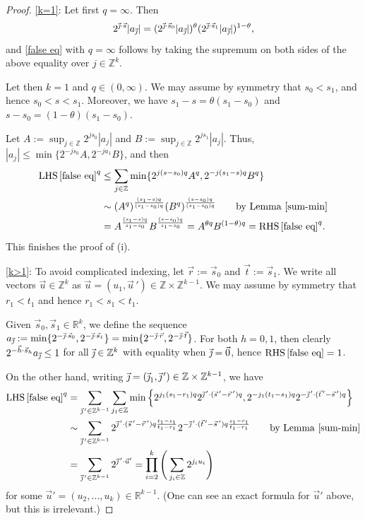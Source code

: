 \documentclass[11pt, reqno]{amsart}
\theoremstyle{definition}
\theoremstyle{remark}
\numberwithin{equation}{section}
\newcommand{\R}{\mathbb R}
\newcommand{\Z}{\mathbb Z}
\newcommand{\vnull}{\vec 0}
\newcommand{\vh}{\vec h}
\newcommand{\vj}{\vec{\textit{\j}}}
\newcommand{\vr}{\vec r}
\newcommand{\vs}{\vec s}
\newcommand{\vt}{\vec t}
\newcommand{\abs}[1]{|#1|}
\begin{document}
\begin{proof}
\eqref{k=1}:
Let first $q=\infty$. Then
\begin{equation*}
  2^{\vj\cdot\vs}\abs{a_{\vj}}
  =(2^{\vj\cdot\vs_0}\abs{a_{\vj}})^{\theta}(2^{\vj\cdot\vs_1}\abs{a_{\vj}})^{1-\theta},
\end{equation*}
and \eqref{false eq} with $q=\infty$ follows by taking the supremum on both sides of the above equality over $j\in\Z^k$.

Let then $k=1$ and $q\in(0,\infty)$. We may assume by symmetry that $s_0<s_1$, and hence $s_0<s<s_1$. Moreover, we have $s_1-s=\theta(s_1-s_0)$ and $s-s_0=(1-\theta)(s_1-s_0)$.

Let $A:=\sup_{j\in\Z} 2^{js_0}\abs{a_j}$ and $B:=\sup_{j\in\Z} 2^{js_1}\abs{a_j}$. Thus, $\abs{a_j}\leq\min\{2^{-js_0}A,2^{-ja_1}B\}$,
and then
\begin{equation*}
\begin{split}
  \operatorname{LHS}\eqref{false eq}^q
  &\leq\sum_{j\in\Z}\min\{2^{j(s-s_0)q}A^q,2^{-j(s_1-s)q}B^q\} \\
  &\sim (A^q)^{\frac{(s_1-s)q}{(s_1-s_0)q}}(B^q)^{\frac{(s-s_0)q}{(s_1-s_0)q}}
  \qquad\text{by Lemma \ref{sum-min}}\\
  &=A^{\frac{(s_1-s)q}{s_1-s_0}}B^{\frac{(s-s_0)q}{s_1-s_0}}
  =A^{\theta q}B^{(1-\theta)q}
  =\operatorname{RHS}\eqref{false eq}^q.
\end{split}
\end{equation*}
This finishes the proof of (i).

\eqref{k>1}:
To avoid complicated indexing, let $\vr:=\vs_0$ and $\vt:=\vs_1$. We write all vectors $\vec u\in\Z^k$ as $\vec u=(u_1,\vec u\,')\in\Z\times\Z^{k-1}$.
We may assume by symmetry that $r_1<t_1$ and hence $r_1<s_1<t_1$.

Given $\vs_0,\vs_1\in\R^k$, we define the sequence $a_{\vj}:=\min\{2^{-\vj\cdot\vs_0},2^{-\vj\cdot\vs_1}\}=\min\{2^{-\vj\cdot\vr},2^{-\vj\cdot\vt}\}$. For both $h=0,1$, then clearly $2^{-\vh\cdot\vs_h}a_{\vj}\leq 1$ for all $\vj\in\Z^k$ with equality when $\vj=\vnull$, hence $\operatorname{RHS}\eqref{false eq}=1$.

On the other hand, writing $\vj=(\vj_1,\vj\,')\in\Z\times\Z^{k-1}$, we have
\begin{equation*}
\begin{split}
  \operatorname{LHS}\eqref{false eq}^q
  &=\sum_{\vj\,'\in\Z^{k-1}} \sum_{j_1\in\Z} \min \Big\{ 2^{j_1(s_1-r_1)q} 2^{\vj\,'\cdot(\vs\,'-\vr\,')q} ,
     2^{-j_1(t_1-s_1)q} 2^{-\vj\,'\cdot(\vt\,'-\vs\,')q}\Big\} \\
  &\sim\sum_{\vj\,'\in\Z^{k-1}} 2^{\vj\,'\cdot(\vs\,'-\vr\,')q\frac{t_1-s_1}{t_1-r_1}}
    2^{-\vj\,'\cdot(\vt\,'-\vs\,')q\frac{s_1-r_1}{t_1-r_1}}\qquad\text{by Lemma \ref{sum-min}} \\
    &=\sum_{\vj\,'\in\Z^{k-1}} 2^{\vj\,'\cdot\vec u'}
    =\prod_{i=2}^k\Bigg(\sum_{j_i\in\Z}2^{j_i u_i}\Bigg)
\end{split}
\end{equation*}
for some $\vec u'=(u_2,\ldots,u_k)\in\R^{k-1}$. (One can see an exact formula for $\vec u'$ above, but this is irrelevant.)


\end{proof}
\end{document}
